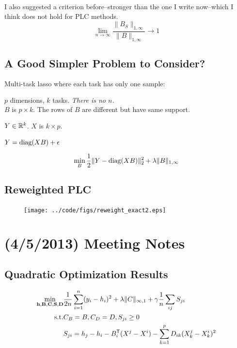 \documentclass{article}
\begin{document}
I also suggested a criterion before--stronger than the one I write now--which I think does not hold for PLC methods.
\[
\lim_{n \rightarrow \infty} \frac{\| B_S \|_{1,\infty}}{\|B \|_{1,\infty}} \rightarrow 1
\]

\subsection{A Good Simpler Problem to Consider?}

Multi-task lasso where each task has only one sample:

$p$ dimensions, $k$ tasks. \emph{There is no $n$.}\\

$B$ is $p \times k$. The rows of $B$ are different but have same support.

$Y \in \mathbb{R}^k$. $X$ is $k \times p$.

$ Y  = \textrm{diag}(X B) + \epsilon$

\begin{align*}
\min_{B} \frac{1}{2}\| Y - \textrm{diag}(XB) \|_2^2 + \lambda \| B \|_{1,\infty}
\end{align*}

\subsection{Reweighted PLC}

\begin{figure}[htp]
\texttt{[image: ../code/figs/reweight\_exact2.eps]}
\end{figure}

\newpage
\section{(4/5/2013) Meeting Notes}

\subsection{Quadratic Optimization Results}

\begin{align*}
\min_{\mathbf{h}, \mathbf{B}, \mathbf{C},\mathbf{S},\mathbf{D}}
& \frac{1}{2n}\sum_{i=1}^n(y_i - h_i)^2 + \lambda \|C\|_{\infty,1} + \gamma \frac{1}{n} \sum_{ij} S_{ji} \\
\textrm{s.t.} & C_B = B, C_D = D, S_{ji} \geq 0 \\
	& S_{ji} = h_j - h_i - B_i^{\mathsf{T}}(X^j - X^i) - \sum_{k=1}^p D_{ik} (X^j_k - X^i_k)^2
\end{align*}
\end{document}
